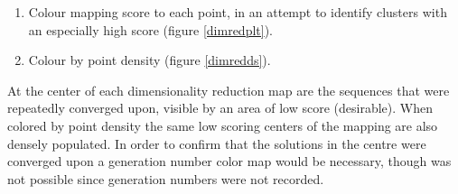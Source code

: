 \documentclass[16pt]{book}
\begin{document}
\begin{enumerate}
	\item Colour mapping score to each point, in an attempt to identify clusters with an especially high score (figure \ref{dimredplt}).
	\item Colour by point density (figure \ref{dimredds}).
\end{enumerate}

At the center of each dimensionality reduction map are the sequences that were repeatedly converged upon, visible by an area of low score (desirable).
When colored by point density the same low scoring centers of the mapping are also densely populated.
In order to confirm that the solutions in the centre were converged upon a generation number color map would be necessary, though was not possible since generation numbers were not recorded.
\end{document}
